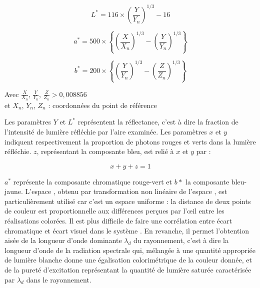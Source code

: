 \begin{equation*}
  L^* = 116 \times \left(\frac{Y}{Y_n}\right)^{1/3} - 16
\end{equation*}

\begin{equation*}
  a^* = 500 \times \left\{%
      \left(\frac{X}{X_n}\right)^{1/3} - 
      \left(\frac{Y}{Y_n}\right)^{1/3}%
    \right\}
\end{equation*}

\begin{equation*}
  b^* = 200 \times \left\{%
      \left(\frac{Y}{Y_n}\right)^{1/3} - 
      \left(\frac{Z}{Z_n}\right)^{1/3}%
    \right\}
\end{equation*}

\noindent 
Avec $\frac{X}{X_n}$, $\frac{Y}{Y_n}$, $\frac{Z}{Z_n} > 0,008856$ \\
et $X_n$, $Y_n$, $Z_n$ : coordonnées du point de référence

Les paramètres $Y$ et $L^*$ représentent la réflectance, c'est à dire 
la fraction de l'intensité de lumière réfléchie par l'aire examinée. 
Les paramètres $x$ et $y$ indiquent respectivement la proportion de 
photons rouges et verts dans la lumière réfléchie. $z$, représentant 
la composante bleu, est relié à $x$ et $y$ par :

\begin{equation*}
  x + y + z = 1
\end{equation*}

$a^*$ représente la composante chromatique rouge-vert et $b*$ la 
composante bleu-jaune. L'espace \Lab, obtenu par transformation 
non linéaire de l'espace \Yxy, est particulièrement utilisé car 
c'est un espace uniforme : la distance de deux points de couleur 
est proportionnelle aux différences perçues par l'{\oe}il entre les 
réalisations colorées. Il est plus difficile de faire une corrélation 
entre écart chromatique et écart visuel dans le système \Yxy. 
En revanche, il permet l'obtention aisée de la longueur d'onde 
dominante $\lambda_d$ du rayonnement, c'est à dire la longueur d'onde 
de la radiation spectrale qui, mélangée à une quantité appropriée de 
lumière blanche donne une égalisation colorimétrique de la couleur 
donnée, et de la pureté d'excitation représentant la quantité de 
lumière saturée caractérisée par $\lambda_d$ dans le rayonnement.

